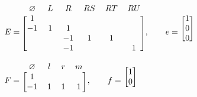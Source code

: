 \documentclass[11pt]{tufte-handout}
\theoremstyle{plain}
\theoremstyle{definition}
\theoremstyle{remark}
\begin{document}
$ E = \begin{blockarray}{c c c c c c}
            \varnothing & L & R & RS & RT & RU\\
            \begin{block}{[c c c c c c]}
                1 &    &   &   & \\
               -1 & 1  & 1 &   & \\
                  &  &  -1 & 1 & 1 \\
                  &  &  -1 &  & & 1 \\
            \end{block}
            \end{blockarray},\quad\quad
    e = \begin{blockarray}{[c]}
                1 \\
                0 \\
                0 \\
            \end{blockarray}
$
\newline
$
    F = \begin{blockarray}{c c c c}
            \varnothing & l & r & m\\
            \begin{block}{[c c c c]}
                1 &    &   & \\
               -1 & 1  & 1 & 1 \\
            \end{block}
            \end{blockarray}, \quad\quad
    f = \begin{blockarray}{[c]}
                1 \\
                0 \\
            \end{blockarray}
$
\newpage
\end{document}
